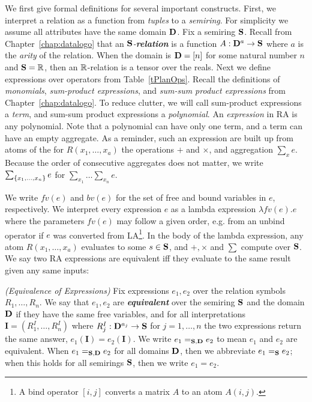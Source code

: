 
We first give formal definitions for several important constructs. First, we interpret a relation as a function from {\em tuples} to a {\em semiring}. For simplicity we assume all attributes have the same domain $\mathbf D$. 
Fix a semiring $\mathbf S$.  
Recall from Chapter~\ref{chap:datalogo} that
an {\em $\mathbf S$-\textbf{relation}} is a function $A: \mathbf D^a \rightarrow \mathbf S$ where $a$ is the {\em arity} of the relation.
When the domain is $\mathbf D = [n]$ for some natural number $n$ and $\mathbf S=\mathbb R$, then an $\mathbb R$-relation is a tensor over the reals.  
Next we define expressions over operators from Table~\ref{tPlanOps}. 
Recall the definitions of {\em monomials}, {\em sum-product expressions},
 and {\em sum-sum product expressions} from Chapter~\ref{chap:datalogo}.
To reduce clutter, we will call sum-product expressions a {\em term}, 
 and sum-sum product expressions a {\em polynomial}. 
An {\em expression} in RA is any polynomial.
Note that a polynomial can have only one term, and a term can have an empty aggregate. 
As a reminder, such an expression are built up from atoms of the for $R(x_1, \ldots, x_a)$ 
 the operations $+$ and $\times$, and aggregation $\sum_x e$.
Because the order of consecutive aggregates does not matter, we write $\sum_{\{x_1, \dots, x_n\}} e$ for $\sum_{x_1} \dots \sum_{x_n} e$. 

We write $fv(e)$ and $bv(e)$ for the set of free and bound variables in $e$, respectively.
We interpret every expression $e$ as a lambda expression $\lambda fv(e) . e$ where the parameters $fv(e)$ may follow a given order, e.g. from an unbind operator if $e$ was converted from LA\footnote{A bind operator $[i,j]$ converts a matrix $A$ to an atom $A(i,j)$.}.
 In the body of the lambda expression, any atom $R(x_1, \dots , x_a)$ evaluates to some $s \in \mathbf S$, and $+, \times$ and $\sum$ compute over $\mathbf S$. We say two RA expressions are equivalent iff they evaluate to the same result given any same inputs: 

\begin{defn}{\em (Equivalence of Expressions)} Fix  expressions $e_1, e_2$ over the relation symbols $R_1, \ldots, R_n$.  We say that $e_1, e_2$ are {\em \textbf{equivalent}} over the semiring $\mathbf S$ and the domain $\mathbf D$ if they have the same free variables, and for all interpretations $\pmb{I} = (R_1^I, \ldots, R_n^I)$ where $R_j^I : \mathbf D^{a_j} \rightarrow \mathbf S$ for $j=1, \ldots, n$ the two expressions return the same answer, $e_1(\pmb{I}) = e_2(\pmb{I})$.  We write $e_1 =_{\mathbf S, \mathbf D} e_2$ to mean $e_1$ and $e_2$ are equivalent.  When $e_1 =_{\mathbf S, \mathbf D} e_2$ for all domains $\mathbf D$, then we abbreviate $e_1 =_\mathbf S e_2$; when this holds for all semirings $\mathbf S$, then we write $e_1 = e_2$.
\end{defn}{}


